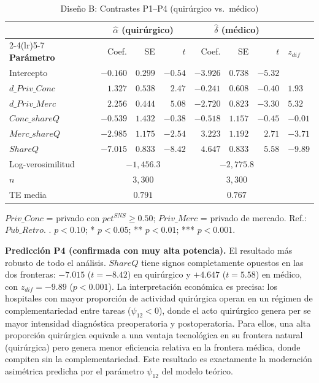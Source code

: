 \begin{table}[htbp]
\centering
\caption{Diseño B: Contrastes P1--P4 (quirúrgico vs.\ médico)}
\label{tab:disB}
\begin{threeparttable}
\begin{tabular}{lrrrrrrl}
\toprule
& \multicolumn{3}{c}{\textbf{$\hat{\alpha}$ (quirúrgico)}}
& \multicolumn{3}{c}{\textbf{$\hat{\delta}$ (médico)}} & \\
\cmidrule(lr){2-4}\cmidrule(lr){5-7}
\textbf{Parámetro} & Coef. & SE & $t$
  & Coef. & SE & $t$ & \textbf{$z_{dif}$} \\
\midrule
Intercepto
  & $-0.160$ & $0.299$ & $-0.54$
  & $-3.926$ & $0.738$ & $-5.32$\sig{***} & \\
$d\_Priv\_Conc$
  & $1.327$  & $0.538$ & $2.47$\sig{*}
  & $-0.241$ & $0.608$ & $-0.40$
  & $1.93$\sig{.} \\
$d\_Priv\_Merc$
  & $2.256$  & $0.444$ & $5.08$\sig{***}
  & $-2.720$ & $0.823$ & $-3.30$\sig{***}
  & $5.32$\sig{***} \\
$Conc\_shareQ$
  & $-0.539$ & $1.432$ & $-0.38$
  & $-0.518$ & $1.157$ & $-0.45$
  & $-0.01$ \\
$Merc\_shareQ$
  & $-2.985$ & $1.175$ & $-2.54$\sig{*}
  & $3.223$  & $1.192$ & $2.71$\sig{**}
  & $-3.71$\sig{***} \\
$ShareQ$
  & $-7.015$ & $0.833$ & $-8.42$\sig{***}
  & $4.647$  & $0.833$ & $5.58$\sig{***}
  & $-9.89$\sig{***} \\
\midrule
Log-verosimilitud & \multicolumn{3}{c}{$-1{,}456.3$}
  & \multicolumn{3}{c}{$-2{,}775.8$} & \\
$n$ & \multicolumn{3}{c}{$3{,}300$}
  & \multicolumn{3}{c}{$3{,}300$} & \\
TE media & \multicolumn{3}{c}{$0.791$}
  & \multicolumn{3}{c}{$0.767$} & \\
\bottomrule
\end{tabular}
\begin{tablenotes}
  \small
  \item $Priv\_Conc$ = privado con $pct^{SNS}\geq 0.50$; $Priv\_Merc$ = privado de mercado. Ref.: $Pub\_Retro$. . $p<0.10$; * $p<0.05$; ** $p<0.01$; *** $p<0.001$.
\end{tablenotes}
\end{threeparttable}
\end{table}

\textbf{Predicción P4 (confirmada con muy alta potencia).} El resultado más robusto de todo el análisis. $ShareQ$ tiene signos completamente opuestos en las dos fronteras: $-7.015$ ($t=-8.42$) en quirúrgico y $+4.647$ ($t=5.58$) en médico, con $z_{dif}=-9.89$ ($p<0.001$). La interpretación económica es precisa: los hospitales con mayor proporción de actividad quirúrgica operan en un régimen de complementariedad entre tareas ($\psi_{12}<0$), donde el acto quirúrgico genera per se mayor intensidad diagnóstica preoperatoria y postoperatoria. Para ellos, una alta proporción quirúrgica equivale a una ventaja tecnológica en su frontera natural (quirúrgica) pero genera menor eficiencia relativa en la frontera médica, donde compiten sin la complementariedad. Este resultado es exactamente la moderación asimétrica predicha por el parámetro $\psi_{12}$ del modelo teórico.

